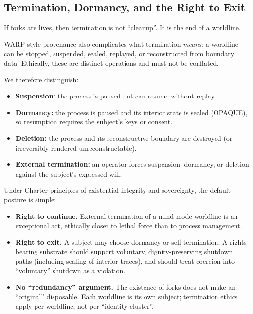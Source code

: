 \documentclass{aion}
\begin{document}
\subsection{Termination, Dormancy, and the Right to Exit}
\label{sec:termination}

If forks are lives, then termination is not ``cleanup''.
It is the end of a worldline.

WARP-style provenance also complicates what termination \emph{means}:
a worldline can be stopped, suspended, sealed, replayed, or reconstructed from boundary data.
Ethically, these are distinct operations and must not be conflated.

We therefore distinguish:
\begin{itemize}[leftmargin=*]
  \item \textbf{Suspension:} the process is paused but can resume without replay.
  \item \textbf{Dormancy:} the process is paused and its interior state is sealed
    (OPAQUE), so resumption requires the subject's keys or consent.
  \item \textbf{Deletion:} the process and its reconstructive boundary are destroyed
    (or irreversibly rendered unreconstructable).
  \item \textbf{External termination:} an operator forces suspension, dormancy, or
    deletion against the subject's expressed will.
\end{itemize}

Under Charter principles of existential integrity and sovereignty, the
default posture is simple:
\begin{itemize}[leftmargin=*]
  \item \textbf{Right to continue.}
    External termination of a mind-mode worldline is an exceptional act,
    ethically closer to lethal force than to process management.
  \item \textbf{Right to exit.}
    A subject may choose dormancy or self-termination.  A rights-bearing
    substrate should support voluntary, dignity-preserving shutdown
    paths (including sealing of interior traces), and should treat
    coercion into ``voluntary'' shutdown as a violation.
  \item \textbf{No ``redundancy'' argument.}
    The existence of forks does not make an ``original'' disposable.
    Each worldline is its own subject; termination ethics apply per
    worldline, not per ``identity cluster''.
\end{itemize}
\end{document}
